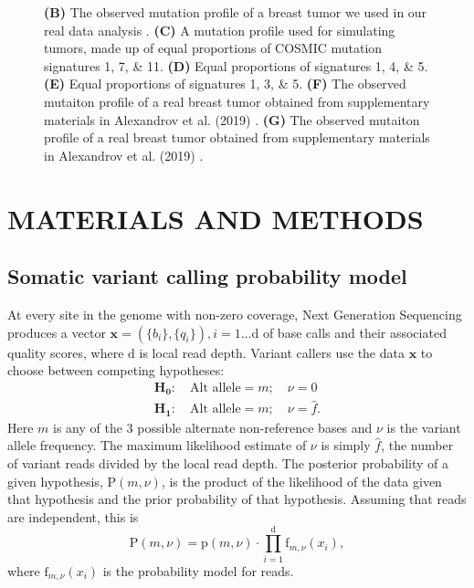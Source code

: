 \documentclass[a4,center,fleqn]{NAR}
\begin{document}
\begin{figure}
{  \textbf{(B)} The observed mutation profile of a breast tumor we used in our real data analysis \cite{Shi2018}.
  \textbf{(C)} A mutation profile used for simulating tumors, made up of equal proportions of COSMIC mutation signatures 1, 7, \& 11.
  \textbf{(D)} Equal proportions of signatures 1, 4, \& 5.
  \textbf{(E)} Equal proportions of signatures 1, 3, \& 5.
  \textbf{(F)} The observed mutaiton profile of a real breast tumor obtained from supplementary materials in Alexandrov et al. (2019) \citep{Alexandrov2019}.
  \textbf{(G)} The observed mutaiton profile of a real breast tumor obtained from supplementary materials in Alexandrov et al. (2019) \citep{Alexandrov2019}.
  }
  \label{NAR-sigfig}
 \end{figure}

\section{MATERIALS AND METHODS}
\subsection{Somatic variant calling probability model}

At every site in the genome with non-zero coverage, Next Generation Sequencing produces a vector $\mathbf{x}  = (\{b_i\},\{q_i\}), i = 1\dots \mathrm{d}$ of base calls and their associated quality scores, where $\mathrm{d}$ is local read depth.
Variant callers use the data $\mathbf{x}$ to choose between competing hypotheses:
\begin{equation}
  \label{eqn:hypothesis}
  \begin{array}{l}
    \mathbf{H_0}:\quad \textrm{Alt allele} = m;\quad\nu = 0\\
    \mathbf{H_1}:\quad \textrm{Alt allele} = m;\quad\nu = \hat{f}.
  \end{array}
\end{equation}
Here $m$ is any of the 3 possible alternate non-reference bases and $\nu$ is the variant allele frequency.
The maximum likelihood estimate of $\nu$ is simply $\hat{f}$, the number of variant reads divided by the local read depth.
The posterior probability of a given hypothesis, $\mathrm{P}(m,\nu)$, is the product of the likelihood of the data given that hypothesis and the prior probability of that hypothesis. 
Assuming that reads are independent, this is
\begin{equation}\label{eqn:1}
  \mathrm{P}(m,\nu) = \mathrm{p}(m,\nu) \cdot \prod_{i=1}^{\mathrm{d}} \textrm{f}_{m,\nu}(x_i),
\end{equation}
where $\textrm{f}_{m,\nu}(x_i)$ is the probability model for reads.
\end{document}
